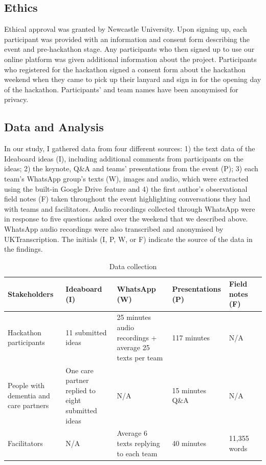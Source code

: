 \subsection{Ethics}
\label{sec:Ethics}
Ethical approval was granted by Newcastle University. Upon signing up, each participant was provided with an information and consent form describing the event and pre-hackathon stage. Any participants who then signed up to use our online platform was given additional information about the project. Participants who registered for the hackathon signed a consent form about the hackathon weekend when they came to pick up their lanyard and sign in for the opening day of the hackathon. Participants’ and team names have been anonymised for privacy.

\subsection{Data and Analysis}
\label{sec:DataAnalysis}
In our study, I gathered data from four different sources: 1) the text data of the Ideaboard ideas (I), including additional comments from participants on the ideas; 2) the keynote, Q\&A and teams’ presentations from the event (P); 3) each team’s WhatsApp group’s texts (W), images and audio, which were extracted using the built-in Google Drive feature and 4) the first author’s observational field notes (F) taken throughout the event highlighting conversations they had with teams and facilitators. Audio recordings collected through WhatsApp were in response to five questions asked over the weekend that we described above. WhatsApp audio recordings were also transcribed and anonymised by UKTranscription. The initials (I, P, W, or F) indicate the source of the data in the findings.

\begin{table}[ht]
\caption{}
\label{table:data collection}
\begin{tabularx}{\textwidth}{@{} Y|YYYYY @{}}
\textbf{Stakeholders} & \textbf{Ideaboard (I)} & \textbf{WhatsApp (W)} & \textbf{Presentations (P)} & \textbf{Field notes (F)} \\ \hline
Hackathon participants & 11 submitted ideas & 25 minutes audio recordings + average 25 texts per team & 117 minutes & N/A \\
People with dementia and care partners & One care partner replied to eight submitted ideas & N/A & 15 minutes Q\&A & N/A \\
Facilitators & N/A & Average 6 texts replying to each team & 40 minutes & 11,355 words \\
\end{tabularx}
\caption{Data collection}
\end{table}


